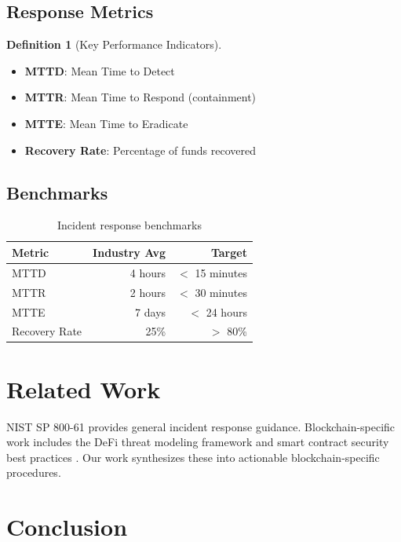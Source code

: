\documentclass[11pt,a4paper]{article}
\theoremstyle{definition}
\newtheorem{definition}{Definition}
\begin{document}
\subsection{Response Metrics}

\begin{definition}[Key Performance Indicators]
\begin{itemize}
    \item \textbf{MTTD}: Mean Time to Detect
    \item \textbf{MTTR}: Mean Time to Respond (containment)
    \item \textbf{MTTE}: Mean Time to Eradicate
    \item \textbf{Recovery Rate}: Percentage of funds recovered
\end{itemize}
\end{definition}

\subsection{Benchmarks}

\begin{table}[h]
\centering
\begin{tabular}{lrr}
\toprule
\textbf{Metric} & \textbf{Industry Avg} & \textbf{Target} \\
\midrule
MTTD & 4 hours & $<$ 15 minutes \\
MTTR & 2 hours & $<$ 30 minutes \\
MTTE & 7 days & $<$ 24 hours \\
Recovery Rate & 25\% & $>$ 80\% \\
\bottomrule
\end{tabular}
\caption{Incident response benchmarks}
\end{table}

\section{Related Work}

NIST SP 800-61 \cite{nist} provides general incident response guidance. Blockchain-specific work includes the DeFi threat modeling framework \cite{defithreat} and smart contract security best practices \cite{consensys}. Our work synthesizes these into actionable blockchain-specific procedures.

\section{Conclusion}
\end{document}
